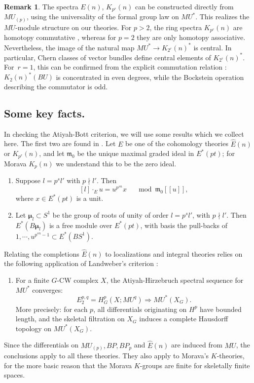 \documentclass[11pt, reqno]{amsart}
\theoremstyle{plain}
\theoremstyle{definition}
\newtheorem{rem}[thm]{Remark}
\newcommand{\frakm}{\mathfrak{m}}
\newcommand{\En}{\widehat{E}(n)}
\DeclareMathOperator*{\gdot}{\cdot}
\begin{document}
\begin{rem} \label{rem:ncKtheory} 
The spectra $E(n)$, $K_{p^r}(n)$ can be constructed directly from $MU_{(p)}$, using the universality 
of the formal group law on $MU^*$. This realizes the $MU$-module structure on our theories. For $p>2$,  the ring spectra 
$K_{p^r}(n)$ are homotopy commutative \cite[Thm.~2.6]{Strickland}, whereas for $p=2$  they are only 
homotopy associative. Nevertheless, the image of the natural map $MU^* \to K_{2^r}(n)^*$ is central. 
In particular,  Chern classes of vector bundles define central elements of $K_{2^r}(n)^*$.  
For~$r=1$,  this can be confirmed from the explicit commutation relation \cite[Theorem~1.5]{Wurgler}: 
$K_{2}(n)^*(BU)$ is concentrated in even degrees,  while the Bockstein operation describing the commutator is odd.  
\end{rem}


\subsection{Some key facts.} \label{sec:facts}
In checking the Atiyah-Bott criterion, we will use some results which we collect here.
The first two are found in \cite[\S5]{HKR}. Let $E$ be one of the cohomology theories $\En$ or 
$K_{p^r}(n)$, and let $\frakm_0$ be the unique 
maximal graded ideal in $E^*(pt)$; for Morava $K_{p}(n)$ we understand this to be the zero ideal.  
\begin{enumerate}\itemsep1ex
\item   \label{lem:Hondagrouplaw}
Suppose $l=p^s l'$ with $p \nmid l'$.  Then 
\[ 
[l]\gdot_{E}u= u^{p^{sn}} x \quad \mod {\frakm_0[[u]]},  
\]
where $x \in E^*(pt)$ is a unit.  
\item  Let $\boldsymbol{\mu}_l\subset S^1$ be the group of  roots of unity of order $l=p^s l'$, 
with $p \nmid l'.$  Then $E^*(B\boldsymbol{\mu}_l)$ is a free module over $E^*(pt)$, with basis 
the pull-backs of $1,\cdots,u^{p^{sn}-1} \subset E^*(BS^1)$.   
\end{enumerate}
Relating the completions $\En$ to localizations and integral theories relies on the following application of 
Landweber's criterion \cite{Landweber2}:
\begin{enumerate}\itemsep1ex
\setcounter{enumi}{2}
\item For a finite $G$-CW complex $X$, the Atiyah-Hirzebruch spectral sequence for $MU^*$ converges:
\[
E_2^{p,q} = H^p_G(X; MU^q) \Rightarrow MU^*(X_G). 
\]
More precisely: for each $p$, all differentials originating on $H^p$ have bounded length, and the 
skeletal filtration on $X_G$ induces a complete Hausdorff topology on $MU^*(X_G)$. 
\end{enumerate}
\noindent
Since the differentials on $MU_{(p)}, BP, BP_p$ and $\En$ are induced from $MU$, the conclusions 
apply to all these theories. They also apply to Morava's $K$-theories, for the more basic reason 
that the Morava $K$-groups are finite for skeletally finite spaces.  
\end{document}
